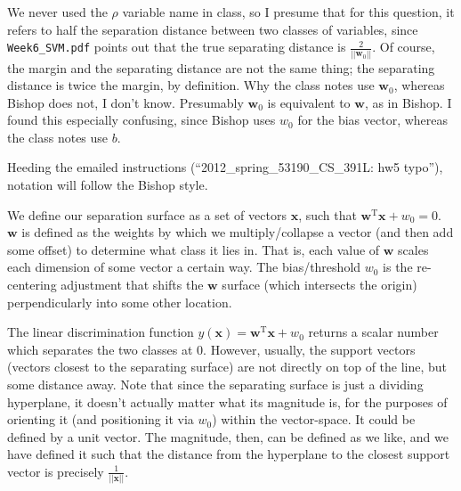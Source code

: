 \documentclass[11pt]{report}
\begin{document}
We never used the $\rho$ variable name in class, so I presume that for this question, it refers to half the separation distance between two classes of variables, since \texttt{Week6\_SVM.pdf} points out that the true separating distance is \(\frac{2}{||\mathbf{w}_0||}\). Of course, the margin and the separating distance are not the same thing; the separating distance is twice the margin, by definition. Why the class notes use $\mathbf{w}_0$, whereas Bishop does not, I don't know. Presumably $\mathbf{w}_0$ is equivalent to $\mathbf{w}$, as in Bishop. I found this especially confusing, since Bishop uses $w_0$ for the bias vector, whereas the class notes use $b$.

Heeding the emailed instructions (``2012\_spring\_53190\_CS\_391L: hw5 typo''), notation will follow the Bishop style.

We define our separation surface as a set of vectors $\mathbf{x}$, such that \(\mathbf{w}^\text{T}\mathbf{x} + w_0 = 0\).
$\mathbf{w}$ is defined as the weights by which we multiply/collapse a vector (and then add some offset) to determine what class it lies in. That is, each value of $\mathbf{w}$ scales each dimension of some vector a certain way. The bias/threshold $w_0$ is the re-centering adjustment that shifts the $\mathbf{w}$ surface (which intersects the origin) perpendicularly into some other location.

The linear discrimination function \(y(\mathbf{x}) = \mathbf{w}^\text{T}\mathbf{x} + w_0\) returns a scalar number which separates the two classes at $0$. However, usually, the support vectors (vectors closest to the separating surface) are not directly on top of the line, but some distance away. Note that since the separating surface is just a dividing hyperplane, it doesn't actually matter what its magnitude is, for the purposes of orienting it (and positioning it via $w_0$) within the vector-space. It could be defined by a unit vector. The magnitude, then, can be defined as we like, and we have defined it such that the distance from the hyperplane to the closest support vector is precisely $\frac{1}{||\mathbf{x}||}$.
\end{document}
